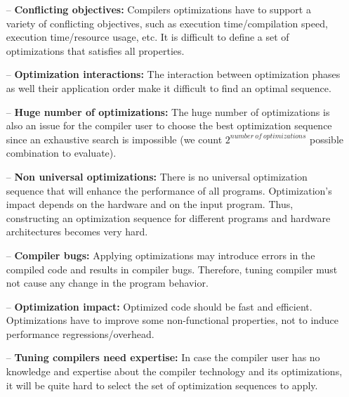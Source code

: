 \begin{itemize}
	\item[--] \textbf{Conflicting objectives:} Compilers optimizations have to support a variety of conflicting objectives, such as execution time/compilation speed, execution time/resource usage, etc. It is difficult to define a set of optimizations that satisfies all properties.
	
	\item[--] \textbf{Optimization interactions:} The interaction between optimization phases as well their application order make it difficult to find an optimal sequence.
	
	\item[--] \textbf{Huge number of optimizations:} The huge number of optimizations is also an issue for the compiler user to choose the best optimization sequence since an exhaustive search is impossible (we count $2^{number\ of\ optimizations}$ possible combination to evaluate).
	
	\item[--] \textbf{Non universal optimizations:} There is no universal optimization sequence that will enhance the performance of all programs. Optimization's impact depends on the hardware and on the input program. Thus, constructing an optimization sequence for different programs and hardware architectures becomes very hard.
	
	\item[--] \textbf{Compiler bugs:} Applying optimizations may introduce errors in the compiled code and results in compiler bugs\cite{le2014compiler,yang2011finding}. Therefore, tuning compiler must not cause any change in the program behavior.
	
	\item[--] \textbf{Optimization impact:} Optimized code should be fast and efficient. Optimizations have to improve some non-functional properties, not to induce performance regressions/overhead.
	
	\item[--] \textbf{Tuning compilers need expertise:} In case the compiler user has no knowledge and expertise about the compiler technology and its optimizations, it will be quite hard to select the set of optimization sequences to apply.
\end{itemize}

 



